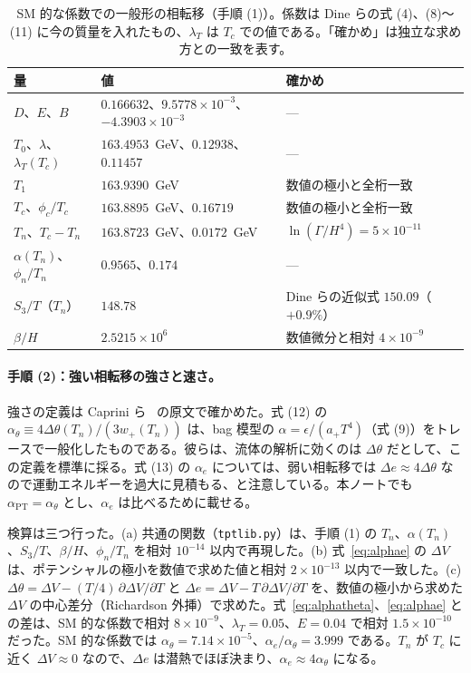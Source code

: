 \documentclass[a4paper,10pt]{ltjsarticle}
\begin{document}
\begin{table}[tbp]
\centering\small
\caption{SM 的な係数での一般形の相転移（手順 (1)）。係数は Dine らの式 (4)、(8)〜(11) に今の質量を入れたもの、$\lambda_T$ は $T_c$ での値である。「確かめ」は独立な求め方との一致を表す。}
\label{tab:dine}
\begin{tabular}{lll}
\toprule
量 & 値 & 確かめ \\
\midrule
$D$、$E$、$B$ & $0.166632$、$9.5778\times10^{-3}$、$-4.3903\times10^{-3}$ & — \\
$T_0$、$\lambda$、$\lambda_T(T_c)$ & $163.4953$~GeV、$0.12938$、$0.11457$ & — \\
$T_1$ & $163.9390$~GeV & 数値の極小と全桁一致 \\
$T_c$、$\phi_c/T_c$ & $163.8895$~GeV、$0.16719$ & 数値の極小と全桁一致 \\
$T_n$、$T_c-T_n$ & $163.8723$~GeV、$0.0172$~GeV & $\ln(\Gamma/H^4)=5\times10^{-11}$ \\
$\alpha(T_n)$、$\phi_n/T_n$ & $0.9565$、$0.174$ & — \\
$S_3/T$（$T_n$） & $148.78$ & Dine らの近似式 $150.09$（$+0.9\%$） \\
$\beta/H$ & $2.5215\times10^6$ & 数値微分と相対 $4\times10^{-9}$ \\
\bottomrule
\end{tabular}
\end{table}

\paragraph{手順 (2)：強い相転移の強さと速さ。}強さの定義は Caprini ら~\cite{caprini20} の原文で確かめた。式 (12) の $\alpha_\theta\equiv4\Delta\theta(T_n)/(3w_+(T_n))$ は、bag 模型の $\alpha=\epsilon/(a_+T^4)$（式 (9)）をトレースで一般化したものである。彼らは、流体の解析に効くのは $\Delta\theta$ だとして、この定義を標準に採る。式 (13) の $\alpha_e$ については、弱い相転移では $\Delta e\approx4\Delta\theta$ なので運動エネルギーを過大に見積もる、と注意している。本ノートでも $\alpha_{\mathrm{PT}}=\alpha_\theta$ とし、$\alpha_e$ は比べるために載せる。

検算は三つ行った。(a) 共通の関数（\texttt{tptlib.py}）は、手順 (1) の $T_n$、$\alpha(T_n)$、$S_3/T$、$\beta/H$、$\phi_n/T_n$ を相対 $10^{-14}$ 以内で再現した。(b) 式~\eqref{eq:alphae} の $\Delta V$ は、ポテンシャルの極小を数値で求めた値と相対 $2\times10^{-13}$ 以内で一致した。(c) $\Delta\theta=\Delta V-(T/4)\,\partial\Delta V/\partial T$ と $\Delta e=\Delta V-T\,\partial\Delta V/\partial T$ を、数値の極小から求めた $\Delta V$ の中心差分（Richardson 外挿）で求めた。式~\eqref{eq:alphatheta}、\eqref{eq:alphae} との差は、SM 的な係数で相対 $8\times10^{-9}$、$\lambda_T=0.05$、$E=0.04$ で相対 $1.5\times10^{-10}$ だった。SM 的な係数では $\alpha_\theta=7.14\times10^{-5}$、$\alpha_e/\alpha_\theta=3.999$ である。$T_n$ が $T_c$ に近く $\Delta V\approx0$ なので、$\Delta e$ は潜熱でほぼ決まり、$\alpha_e\approx4\alpha_\theta$ になる。
\end{document}
